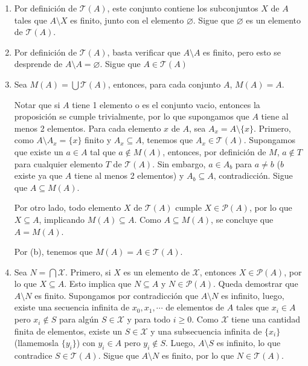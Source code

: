 \begin{enumerate}[label=\alph*)]
    \item Por definición de $\mathcal{T}(A)$, este conjunto contiene los subconjuntos $X$ de $A$ tales que $A\setminus X$ es finito, junto con el elemento $\varnothing$.  Sigue que $\varnothing$ es un elemento de $\mathcal{T}(A)$.
    \item Por definición de  $\mathcal{T}(A)$, basta verificar que $A\setminus A$ es finito, pero esto se desprende de $A\setminus A=\varnothing$. Sigue que $A\in \mathcal{T}(A)$
    \item \begin{claim}
    Sea $M(A)=\bigcup \mathcal{T}(A)$, entonces, para cada conjunto $A$, $M(A)=A$.
    \end{claim}
    \begin{dem}
    Notar que si $A$ tiene 1 elemento o es el conjunto vacio, entonces la proposición se cumple trivialmente, por lo que supongamos que $A$ tiene al menos 2 elementos. Para cada elemento $x$ de $A$, sea $A_x=A\setminus \{x\}$. Primero, como $A\setminus A_x=\{x\}$ finito y $A_x\subseteq A$, tenemos que $A_x\in\mathcal{T}(A)$. Supongamos que existe un $a\in A$ tal que $a\notin M(A)$, entonces, por definición de $M$, $a\notin T$ para cualquier elemento $T$ de $\mathcal{T}(A)$. Sin embargo, $a\in A_b$ para $a\neq b$ ($b$ existe ya que $A$ tiene al menos 2 elementos) y  $A_b\subseteq A$, contradicción. Sigue que $A\subseteq M(A)$.
    
    Por otro lado, todo elemento $X$ de $\mathcal{T}(A)$ cumple $X\in \mathcal{P}(A)$, por lo que $X\subseteq A$, implicando $M(A)\subseteq A$. Como $A\subseteq M(A)$, se concluye que $A=M(A)$.
    \end{dem}
    
    Por (b), tenemos que $M(A)=A\in \mathcal{T}(A)$.
   \item 
    Sea $N=\bigcap \mathcal{X}$. Primero, si $X$ es un elemento de $\mathcal{X}$, entonces $X \in \mathcal{P}(A)$, por lo que $X\subseteq A$. Esto implica que $N\subseteq A$ y $N\in \mathcal{P}(A)$. Queda demostrar que $A\setminus N$ es finito. Supongamos por contradicción que $A\setminus N$ es infinito, luego, existe una secuencia infinita de $x_0,x_1,\cdots$ de elementos de $A$ tales que $x_i\in A$ pero $x_i \not\in S$ para algún $S\in \mathcal{X}$ y para todo $i\geq 0$. Como $\mathcal{X}$ tiene una cantidad finita de elementos, existe un $S\in\mathcal{X}$ y una subsecuencia infinita de $\{x_i\}$ (llamemosla $\{y_i\}$) con $y_i\in A$ pero $y_i\notin S$. Luego, $A \setminus S$ es infinito, lo que contradice $S\in \mathcal{T}(A)$. Sigue que $A\setminus N$ es finito, por lo que $N\in \mathcal{T}(A)$.
    
\end{enumerate}